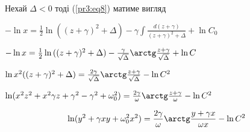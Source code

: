 

Нехай $\Delta < 0$ тоді  (\ref{pr3:eq8}) матиме вигляд 

$-\ln x = \frac{1}{2} \ln {((z+\gamma)^2 + \Delta)} - \gamma \int \frac{d(z+\gamma)}{(z + \gamma)^2 + \Delta} + \ln C_0$

$-\ln x = \frac{1}{2} \ln {((z+\gamma)^2 + \Delta)} - \frac{\gamma}{\sqrt{\Delta}} \arctg \frac{z+\gamma}{\sqrt{\Delta}}+ \ln C$

$\ln x^2((z+\gamma)^2 +\Delta) = \frac{2\gamma}{\sqrt{\Delta}} \arctg \frac{z+\gamma}{\sqrt{\Delta}} - \ln C^2$

$\ln ( x^2z^2+x^2\gamma z + \gamma^2 - \gamma^2 + \omega_0^2) = \frac{2\gamma}{\omega} \arctg \frac{z+\gamma}{\omega} - \ln C^2$

\begin{equation}
    \ln ( y^2+\gamma xy + \omega_0^2 x^2) = \frac{2\gamma}{\omega} \arctg \frac{y+\gamma x}{\omega x} - \ln C^2
\end{equation}